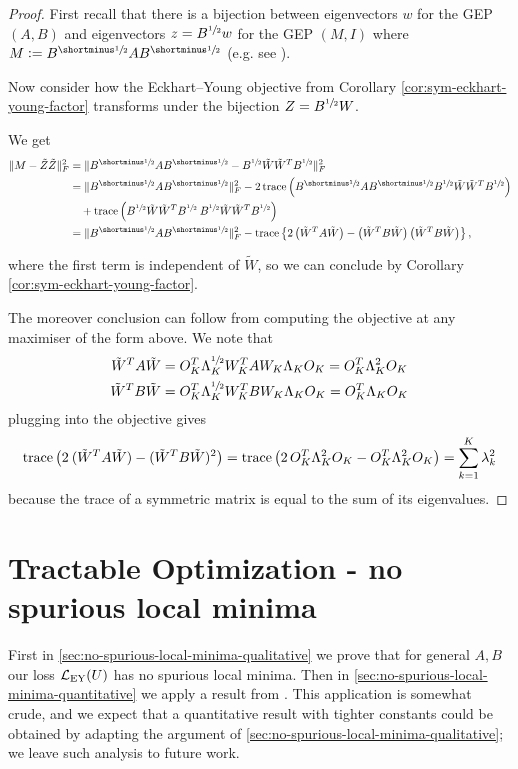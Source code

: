 \begin{proof}
    First recall that there is a bijection between eigenvectors $w$ for the GEP $(A,B)$ and eigenvectors $z = B^{\sfrac{1}{2}} w$ for the GEP $(M,I)$ where $M \defeq B^\mhalf A B^\mhalf$ (e.g. see \citet{chapman2022generalized}).

    Now consider how the Eckhart--Young objective from Corollary \ref{cor:sym-eckhart-young-factor} transforms under the bijection $Z = B^{\sfrac{1}{2}} W$.

    We get
    \begin{align*}
        \| M - \tilde{Z} \tilde{Z} \|_F^2
        &= \| B^\mhalf A B^\mhalf - B^\half \tilde{W} \tilde{W}^T B^\half \|_F^2 \\
        &= \| B^\mhalf A B^\mhalf \|_F^2 - 2\tr\left( B^\mhalf A B^\mhalf B^\half \tilde{W} \tilde{W}^T B^\half \right) \\
        &\quad + \tr\left(B^\half \tilde{W} \tilde{W}^T B^\half \: B^\half \tilde{W} \tilde{W}^T B^\half \right) \\
        &= \| B^\mhalf A B^\mhalf \|_F^2 - \tr\left\{2 \left(\tilW^T A \tilW\right) - \left(\tilW^T B \tilW\right) \left(\tilW^T B \tilW\right) \right\},
    \end{align*}

    where the first term is independent of $\tilde{W}$, so we can conclude by Corollary \ref{cor:sym-eckhart-young-factor}.

    The moreover conclusion can follow from computing the objective at any maximiser of the form above. We note that
    \begin{align*}
        \Tilde{W}^T A \Tilde{W} &= O_K^T \Lambda_K^{\sfrac{1}{2}} W_K^T A W_K \Lambda_K O_K = O_K^T \Lambda_K^2 O_K \\
        \Tilde{W}^T B \Tilde{W} &= O_K^T \Lambda_K^{\sfrac{1}{2}} W_K^T B W_K \Lambda_K O_K = O_K^T \Lambda_K O_K
    \end{align*}
    plugging into the objective gives
    \begin{align*}
        \operatorname{trace} \left(2 \: (\Tilde{W}^T A \Tilde{W}) - (\Tilde{W}^T B \Tilde{W})^2\right) = \operatorname{trace} \left(2 \,O_K^T \Lambda_K^2 O_K - O_K^T \Lambda_K^2 O_K\right)
        = \sum_{k=1}^K \lambda_k^2
    \end{align*}
    because the trace of a symmetric matrix is equal to the sum of its eigenvalues.
\end{proof}


\section{Tractable Optimization - no spurious local minima}\label{supp:tractable-optimization}\label{app:tractable-optimization}
First in \cref{sec:no-spurious-local-minima-qualitative} we prove that for general $A, B$ our loss $\mathcal{L}_\text{EY}(U)$ has no spurious local minima.
Then in \cref{sec:no-spurious-local-minima-quantitative} we apply a result from \citet{ge_no_2017}.
This application is somewhat crude, and we expect that a quantitative result with tighter constants could be obtained by adapting the argument of \cref{sec:no-spurious-local-minima-qualitative}; we leave such analysis to future work.

